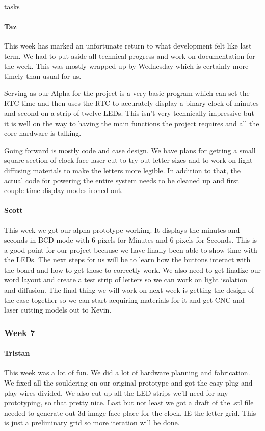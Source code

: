 tasks\documentclass[onecolumn, draftclsnofoot,10pt, compsoc]{IEEEtran}
\begin{document}
\paragraph{Taz}
This week has marked an unfortunate return to what development felt like last term. We had to put aside all technical progress and work on documentation for the week. This was mostly wrapped up by Wednesday which is certainly more timely than usual for us.

Serving as our Alpha for the project is a very basic program which can set the RTC time and then uses the RTC to accurately display a binary clock of minutes and second on a strip of twelve LEDs. This isn't very technically impressive but it is well on the way to having the main functions the project requires and all the core hardware is talking.

Going forward is mostly code and case design. We have plans for getting a small square section of clock face laser cut to try out letter sizes and to work on light diffusing materials to make the letters more legible. In addition to that, the actual code for powering the entire system needs to be cleaned up and first couple time display modes ironed out.
\paragraph{Scott}
This week we got our alpha prototype working. It displays the minutes and seconds in BCD mode with 6 pixels for Minutes and 6 pixels for Seconds. This is a good point for our project because we have finally been able to show time with the LEDs. The next steps for us will be to learn how the buttons interact with the board and how to get those to correctly work. We also need to get finalize our word layout and create a test strip of letters so we can work on light isolation and diffusion. The final thing we will work on next week is getting the design of the case together so we can start acquiring materials for it and get CNC and laser cutting models out to Kevin.
\subsubsection{Week 7}
\paragraph{Tristan}
This week was a lot of fun. We did a lot of hardware planning and fabrication. We fixed all the souldering on our original prototype and got the easy plug and play wires divided. We also cut up all the LED strips we'll need for any prototyping, so that pretty nice. Last but not least we got a draft of the .stl file needed to generate out 3d image face place for the clock, IE the letter grid. This is just a preliminary grid so more iteration will be done.
\end{document}
